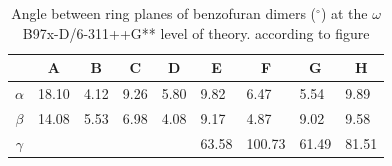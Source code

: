\begin{table}[htbp]
	\caption{Angle between ring planes of benzofuran dimers ($^{\circ}$) at the $\omega$B97x-D/6-311++G** level of theory. according to figure }
	\begin{center}
	\begin{tabular}{cllllllll}
		\toprule
				& \multicolumn{1}{c}{\textbf{A}} & \multicolumn{1}{c}{\textbf{B}} & \multicolumn{1}{c}{\textbf{C}} & \multicolumn{1}{c}{\textbf{D}} & \multicolumn{1}{c}{\textbf{E}} & \multicolumn{1}{c}{\textbf{F}} & \multicolumn{1}{c}{\textbf{G}} & \multicolumn{1}{c}{\textbf{H}} \\ 
				\midrule
		\textbf{$\alpha$
		} & 18.10 & 4.12 & 9.26 & 5.80 & 9.82 & 6.47 & 5.54 & 9.89 \\ 
		\textbf{$\beta$
		} & 14.08 & 5.53 & 6.98 & 4.08 & 9.17 & 4.87 & 9.02 & 9.58 \\ 
		\textbf{$\gamma$
		} & \multicolumn{1}{c}{} & \multicolumn{1}{c}{} & \multicolumn{1}{c}{} & \multicolumn{1}{c}{} & \multicolumn{1}{c}{63.58} & \multicolumn{1}{c}{100.73} & \multicolumn{1}{c}{61.49} & \multicolumn{1}{c}{81.51} \\ 
		\bottomrule
	\end{tabular}
\end{center}
	\label{}
\end{table}

